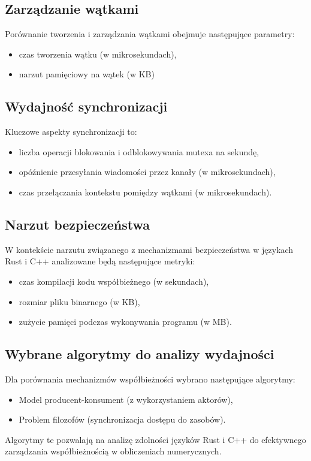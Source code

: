 \subsection{Zarządzanie wątkami}
Porównanie tworzenia i zarządzania wątkami obejmuje następujące parametry:
\begin{itemize}
\item czas tworzenia wątku (w mikrosekundach),
\item narzut pamięciowy na wątek (w KB)
\end{itemize}

\subsection{Wydajność synchronizacji}
Kluczowe aspekty synchronizacji to:
\begin{itemize}
\item liczba operacji blokowania i odblokowywania mutexa na sekundę,
\item opóźnienie przesyłania wiadomości przez kanały (w mikrosekundach),
\item czas przełączania kontekstu pomiędzy wątkami (w mikrosekundach).
\end{itemize}

\subsection{Narzut bezpieczeństwa}
W kontekście narzutu związanego z mechanizmami bezpieczeństwa w językach Rust i C++ analizowane będą następujące metryki:
\begin{itemize}
\item czas kompilacji kodu współbieżnego (w sekundach),
\item rozmiar pliku binarnego (w KB),
\item zużycie pamięci podczas wykonywania programu (w MB).
\end{itemize}

\subsection{Wybrane algorytmy do analizy wydajności}
Dla porównania mechanizmów współbieżności wybrano następujące algorytmy:
\begin{itemize}
    \item Model producent-konsument (z wykorzystaniem aktorów),
    \item Problem filozofów (synchronizacja dostępu do zasobów).
\end{itemize}
Algorytmy te pozwalają na analizę zdolności języków Rust i C++ do efektywnego zarządzania współbieżnością w obliczeniach numerycznych.


